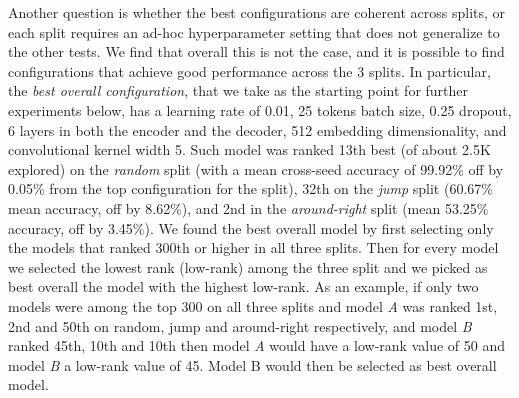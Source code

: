 Another question is whether the best configurations are coherent
across splits, or each split requires an ad-hoc hyperparameter setting
that does not generalize to the other tests. We find that overall this
is not the case, and it is possible to find configurations that
achieve good performance across the 3 splits. In particular, the
\emph{best overall configuration}, that we take as the starting point
for further experiments below, has a learning rate of 0.01, 25 tokens
batch size, 0.25 dropout, 6 layers in both the encoder and the
decoder, 512 embedding dimensionality, and convolutional kernel width
5. Such model was ranked 13th best (of about 2.5K explored) on the
\emph{random} split (with a mean cross-seed accuracy of 99.92\% off by
0.05\% from the top configuration for the split), 32th on the
\emph{jump} split (60.67\% mean accuracy, off by 8.62\%), and 2nd in
the \emph{around-right} split (mean 53.25\% accuracy, off by
3.45\%). 
 We found the best overall model by first selecting only the models
that ranked 300th or higher in all three splits. Then for every model
we selected the lowest rank (low-rank) among the three split and we picked 
as best overall the model with the highest low-rank. As an example, if only
two models were among the top 300 on all three splits and model \textit{A} was
ranked 1st, 2nd and 50th on random, jump and around-right respectively, and model \textit{B}
ranked 45th, 10th and 10th then model \textit{A} would have a low-rank value of 50 and
model \textit{B} a low-rank value of 45. Model B would then be selected as best overall model.

 

